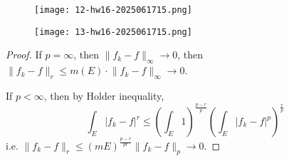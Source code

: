 \begin{exercise}
\begin{figure}[H]
\centering
\texttt{[image: 12-hw16-2025061715.png]}
\label{}
\end{figure}
\begin{figure}[H]
\centering
\texttt{[image: 13-hw16-2025061715.png]}
\label{}
\end{figure}
\end{exercise}
\begin{proof}
If $p=\infty$, then $\lVert f_k-f \rVert_{\infty}\to0$, then $\lVert f_k-f \rVert_{r}\leq m(E)\cdot \lVert f_k-f \rVert_{\infty}\to0$.

If $p<\infty$, then by Holder inequality,
\[
\int_{E}^{} \lvert f_k-f \rvert ^{r}\leq \left( \int_{E}1 \right)^{\frac{p-r}{p}}\left( \int_{E}\lvert f_k-f \rvert ^{p} \right)^{\frac{r}{p}}
\]
i.e. $\lVert f_k-f \rVert_{r}\leq(mE)^{\frac{p-r}{pr}}\lVert f_k-f \rVert_{p}\to0$.
\end{proof}

